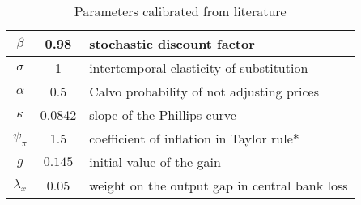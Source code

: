 \documentclass[11pt]{article}
\renewcommand{\[}{\begin{equation}}
\renewcommand{\]}{\end{equation}}
\begin{document}
\begin{center}
\begin{table}
\begin{tabular}{ c | c  | l }
\hline
 $\beta$ & 0.98 & stochastic discount factor \\  \hline
 $\sigma$ & 1  & intertemporal elasticity of substitution \\  \hline
 $\alpha$ & 0.5 &  Calvo probability of not adjusting prices \\\hline
 $\kappa$ & 0.0842 &  slope of the Phillips curve \\\hline
 $\psi_{\pi} $& 1.5  & coefficient of inflation in Taylor rule*\\\hline
 $\bar{g}$ & $0.145$  & initial value of the gain \\\hline %
    $\lambda_x$ & 0.05 & weight on the output gap in central bank loss   \\ \hline  %
\end{tabular}     
      \caption{Parameters calibrated from literature}  \label{calibration}
 \end{table}
\end{center}
\end{document}
